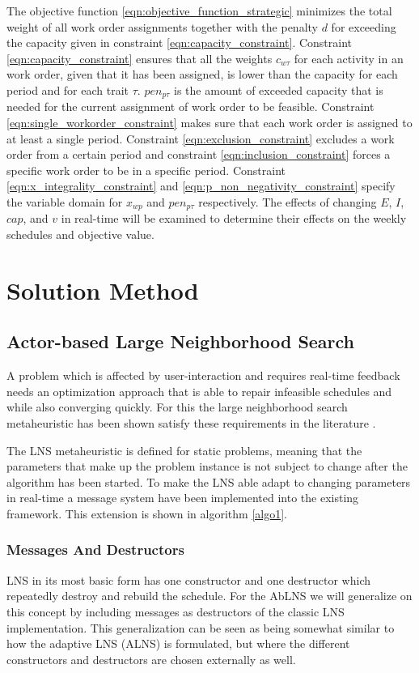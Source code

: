 \documentclass[preprint,12pt,authoryear]{elsarticle}
\begin{document}
The objective function \eqref{eqn:objective_function_strategic} minimizes the total weight of all work order assignments together with the penalty $d$ for exceeding the capacity given in constraint \eqref{eqn:capacity_constraint}. Constraint \eqref{eqn:capacity_constraint} ensures that all the weights $c_{w\tau}$ for each activity in an work order, given that it has been assigned, is lower than the capacity for each period and for each trait $\tau$. $pen_{p\tau}$ is the amount of exceeded capacity that is needed for the current assignment of work order to be feasible. Constraint \eqref{eqn:single_workorder_constraint} makes sure that each work order is assigned to at least a single period. Constraint \eqref{eqn:exclusion_constraint} excludes a work order from a certain period and constraint \eqref{eqn:inclusion_constraint} forces a specific work order to be in a specific period. Constraint \eqref{eqn:x_integrality_constraint} and \eqref{eqn:p_non_negativity_constraint} specify the variable domain for $x_{wp}$ and $pen_{p\tau}$ respectively. The effects of changing $E$, $I$, $cap$, and $v$ in real-time will be examined to determine their effects on the weekly schedules and objective value.

\section{Solution Method}
\label{sec:2-solution-method}

\subsection{Actor-based Large Neighborhood Search}
A problem which is affected by user-interaction and requires real-time feedback needs an optimization approach that is able to repair infeasible schedules and while also 
converging quickly. For this the large neighborhood search metaheuristic has been shown satisfy these requirements in the literature \cite{gendreauHandbookMetaheuristics2019}. 

The LNS metaheuristic is defined for static problems, meaning that the parameters that make up the problem instance is not subject to change 
after the algorithm has been started. To make the LNS able adapt to changing parameters in real-time a message system have been implemented into the existing framework. This 
extension is shown in algorithm \ref{algo1}.  

\subsubsection{Messages And Destructors}
LNS in its most basic form has one constructor and one destructor which repeatedly destroy and rebuild the schedule. For the AbLNS we will generalize on this concept by 
including messages as destructors of the classic LNS implementation. This generalization can be seen as being somewhat similar to how the adaptive LNS (ALNS) is formulated,
but where the different constructors and destructors are chosen externally as well. 
\end{document}
